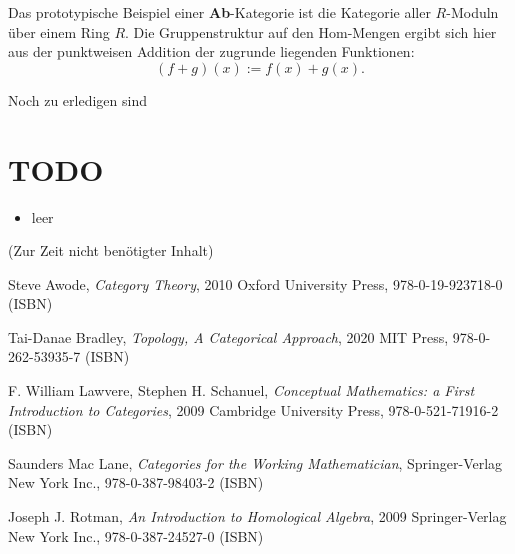 \documentclass[a4paper]{amsart}
\theoremstyle{definition}
\begin{document}
Das prototypische Beispiel einer \textbf{Ab}-Kategorie ist die Kategorie aller $R$-Moduln über einem  Ring $R$. Die Gruppenstruktur auf den Hom-Mengen ergibt sich hier aus der punktweisen Addition der zugrunde liegenden Funktionen:
\begin{equation}
   (f+g)(x) := f(x) + g(x).
\end{equation}  

\begin{backup}
Noch zu erledigen sind
\section{TODO}
\begin{itemize}
   \item leer
\end{itemize}
\end{backup}

\begin{backup}
    (Zur Zeit nicht benötigter Inhalt)
\end{backup}

\begin{thebibliography}{9}
      Steve Awode, \emph{Category Theory},
      2010 Oxford University Press, 978-0-19-923718-0 (ISBN)

      Tai-Danae Bradley, \emph{Topology, A Categorical Approach},
      2020 MIT Press, 978-0-262-53935-7 (ISBN)

      F. William Lawvere, Stephen H. Schanuel, \emph{Conceptual Mathematics: a First Introduction to Categories},
      2009 Cambridge University Press, 978-0-521-71916-2 (ISBN)

      Saunders Mac Lane, \emph{Categories for the Working Mathematician},
      Springer-Verlag New York Inc., 978-0-387-98403-2 (ISBN)

   	Joseph J. Rotman, \emph{An Introduction to Homological Algebra},
   	2009 Springer-Verlag New York Inc., 978-0-387-24527-0 (ISBN)
      
\end{thebibliography}
\end{document}
